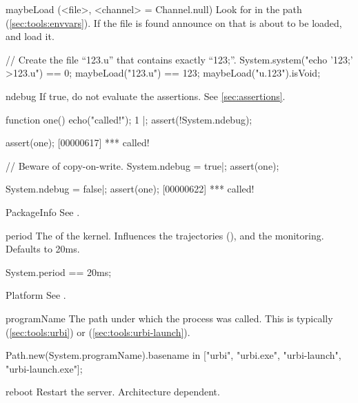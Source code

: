 \begin{urbiscriptapi}
\item[maybeLoad](<file>, <channel> = Channel.null)%
  Look for  in the \urbi path (\autoref{sec:tools:envvars}).
  If the file is found announce on  that  is
  about to be loaded, and load it.

\begin{urbiassert}
// Create the file ``123.u'' that contains exactly ``123;''.
System.system("echo '123;' >123.u") == 0;
maybeLoad("123.u") == 123;
maybeLoad("u.123").isVoid;
\end{urbiassert}


\item[ndebug] If true, do not evaluate the assertions.  See
  \autoref{sec:assertions}.
\begin{urbiscript}
function one() { echo("called!"); 1 }|;
assert(!System.ndebug);

assert(one);
[00000617] *** called!

// Beware of copy-on-write.
System.ndebug = true|;
assert(one);

System.ndebug = false|;
assert(one);
[00000622] *** called!
\end{urbiscript}




\item[PackageInfo] See .


\item[period] The  of the \urbi kernel.  Influences the
  trajectories (), and the \UObject
  monitoring.  Defaults to 20ms.
\begin{urbiassert}
System.period == 20ms;
\end{urbiassert}


\item[Platform] See .


\item[programName] The path under which the \urbi process was called.
  This is typically  (\autoref{sec:tools:urbi}) or
   (\autoref{sec:tools:urbi-launch}).
\begin{urbiassert}
Path.new(System.programName).basename
  in ["urbi", "urbi.exe", "urbi-launch", "urbi-launch.exe"];
\end{urbiassert}


\item[reboot] Restart the \urbi server.  Architecture dependent.



\end{urbiscriptapi}
